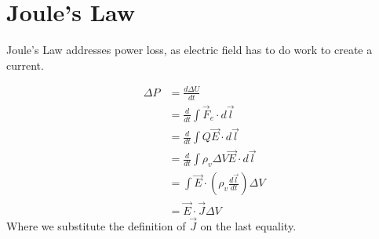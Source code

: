 \documentclass[12pt]{article}
\begin{document}
\section{Joule's Law}

Joule's Law addresses power loss, as electric field has to do work to create a current.

\begin{align*}
	\Delta P &= \frac{d\Delta U}{dt} \\
		 &= \frac{d}{dt} \int\vec{F}_e \cdot d\vec{l} \\
		 &= \frac{d}{dt}\int Q\vec{E} \cdot d\vec{l} \\
		 &= \frac{d}{dt} \int\rho_v \Delta V \vec{E} \cdot d\vec{l} \\
		 &= \int \vec{E} \cdot \left(\rho_v \frac{d\vec{l}}{dt}\right) \Delta V \\
		 &= \vec{E} \cdot \vec{J} \Delta V
\end{align*}
Where we substitute the definition of $\vec{J}$ on the last equality.
\end{document}
